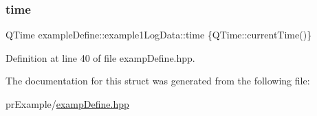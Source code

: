 \subsubsection{\texorpdfstring{time}{time}}
{\footnotesize\ttfamily Q\+Time example\+Define\+::example1\+Log\+Data\+::time \{Q\+Time\+::current\+Time()\}}



Definition at line 40 of file examp\+Define.\+hpp.



The documentation for this struct was generated from the following file\+:\begin{DoxyCompactItemize}
\item 
pr\+Example/\hyperlink{examp_define_8hpp}{examp\+Define.\+hpp}\end{DoxyCompactItemize}
